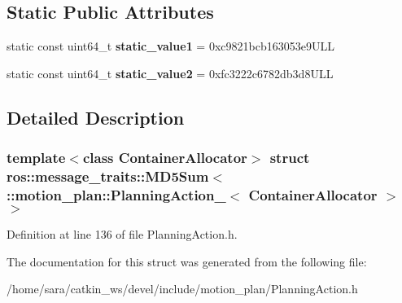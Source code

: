 \subsection*{Static Public Attributes}
\begin{DoxyCompactItemize}
\item 
\mbox{\label{structros_1_1message__traits_1_1MD5Sum_3_01_1_1motion__plan_1_1PlanningAction___3_01ContainerAllocator_01_4_01_4_afacd77cc0edfc5fe1a4180d1547554a3}} 
static const uint64\+\_\+t {\bfseries static\+\_\+value1} = 0xc9821bcb163053e9\+U\+LL
\item 
\mbox{\label{structros_1_1message__traits_1_1MD5Sum_3_01_1_1motion__plan_1_1PlanningAction___3_01ContainerAllocator_01_4_01_4_a4ce6935ba44fbe0a592a940979cceb6d}} 
static const uint64\+\_\+t {\bfseries static\+\_\+value2} = 0xfc3222c6782db3d8\+U\+LL
\end{DoxyCompactItemize}


\subsection{Detailed Description}
\subsubsection*{template$<$class Container\+Allocator$>$\newline
struct ros\+::message\+\_\+traits\+::\+M\+D5\+Sum$<$ \+::motion\+\_\+plan\+::\+Planning\+Action\+\_\+$<$ Container\+Allocator $>$ $>$}



Definition at line 136 of file Planning\+Action.\+h.



The documentation for this struct was generated from the following file\+:\begin{DoxyCompactItemize}
\item 
/home/sara/catkin\+\_\+ws/devel/include/motion\+\_\+plan/Planning\+Action.\+h\end{DoxyCompactItemize}
